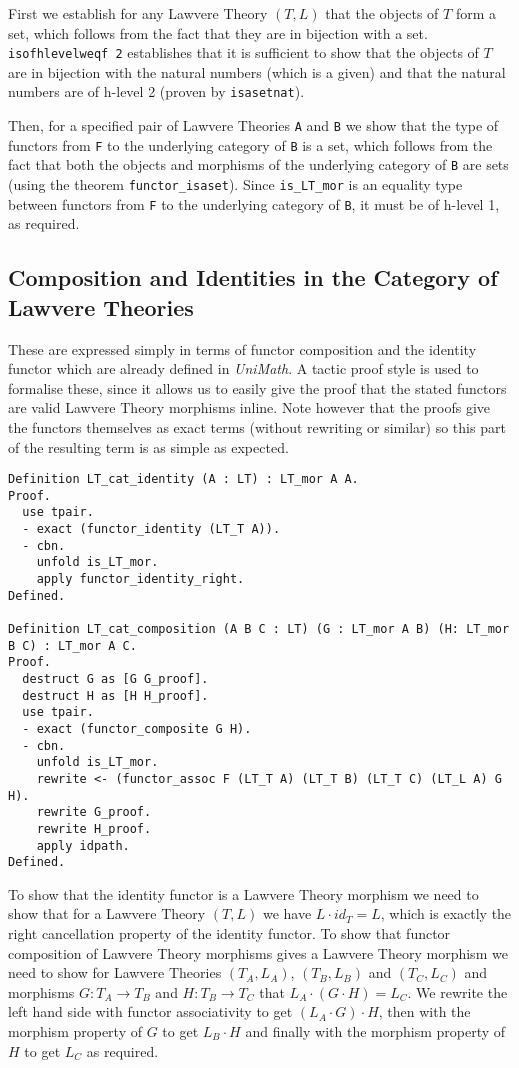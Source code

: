 First we establish for any Lawvere Theory $(T, L)$ that the objects of $T$ form
a set, which follows from the fact that they are in bijection with a set.
\lstinline|isofhlevelweqf 2| establishes that it is sufficient to show that the
objects of $T$ are in bijection with the natural numbers (which is a given) and
that the natural numbers are of h-level 2 (proven by \lstinline|isasetnat|).

Then, for a specified pair of Lawvere Theories \lstinline|A| and \lstinline|B|
we show that the type of functors from \lstinline|F| to the underlying category
of \lstinline|B| is a set, which follows from the fact that both the objects and
morphisms of the underlying category of \lstinline|B| are sets (using the
theorem \lstinline|functor_isaset|). Since \lstinline|is_LT_mor| is an equality
type between functors from \lstinline|F| to the underlying category of
\lstinline|B|, it must be of h-level 1, as required.

\subsection{Composition and Identities in the Category of Lawvere Theories}
These are expressed simply in terms of functor composition and the identity
functor which are already defined in \textit{UniMath}. A tactic proof style is
used to formalise these, since it allows us to easily give the proof that the
stated functors are valid Lawvere Theory morphisms inline. Note however that
the proofs give the functors themselves as exact terms (without rewriting or
similar) so this part of the resulting term is as simple as expected.
\begin{lstlisting}
Definition LT_cat_identity (A : LT) : LT_mor A A.
Proof.
  use tpair.
  - exact (functor_identity (LT_T A)).
  - cbn.
    unfold is_LT_mor.
    apply functor_identity_right.
Defined.

Definition LT_cat_composition (A B C : LT) (G : LT_mor A B) (H: LT_mor B C) : LT_mor A C.
Proof.
  destruct G as [G G_proof].
  destruct H as [H H_proof].
  use tpair.
  - exact (functor_composite G H).
  - cbn.
    unfold is_LT_mor.
    rewrite <- (functor_assoc F (LT_T A) (LT_T B) (LT_T C) (LT_L A) G H).
    rewrite G_proof.
    rewrite H_proof.
    apply idpath.
Defined.
\end{lstlisting}

To show that the identity functor is a Lawvere Theory morphism we need to show
that for a Lawvere Theory $(T, L)$ we have $L\cdot id_T = L$, which is exactly
the right cancellation property of the identity functor. To show that functor
composition of Lawvere Theory morphisms gives a Lawvere Theory morphism we need
to show for Lawvere Theories $(T_A, L_A)$, $(T_B, L_B)$ and $(T_C, L_C)$
and morphisms $G: T_A\to T_B$ and $H: T_B\to T_C$ that $L_A\cdot (G\cdot H) =
L_C$. We rewrite the left hand side with functor associativity to get $(L_A\cdot
G)\cdot H$, then with the morphism property of $G$ to get $L_B\cdot H$ and
finally with the morphism property of $H$ to get $L_C$ as required.

